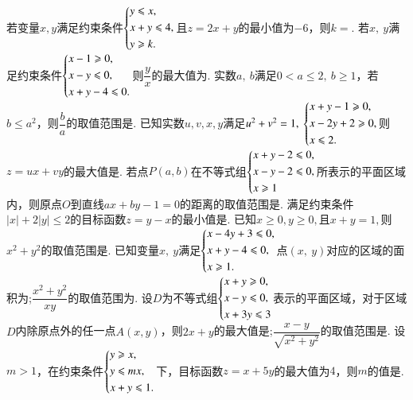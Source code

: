 \documentclass{BHCexam}
\begin{document}
\begin{questions}
\qs 若变量$x,y$满足约束条件$\begin{dcases}
y\le x,\\
x+y\le 4,\\
y\ge k.
\end{dcases}$且$z=2x+y$的最小值为$ -6 $，则$ k= $\tk.
\qs 若$  x,~y $满足约束条件$\begin{dcases}
x-1\ge 0,\\
x-y\le 0,\\
x+y-4\le 0.
\end{dcases}$则$ \dfrac{y}{x} $的最大值为\tk.
\qs 实数$ a,~b $满足$ 0<a\le 2,~b\ge 1 $，若$ b\le a^2 $，则$ \dfrac{b}{a} $的取值范围是\tk.
\qs 已知实数$ u,v,x,y $满足$ u^2+v^2=1,~\begin{dcases}
x+y-1\ge 0,\\
x-2y+2\ge 0,\\
x\le 2.
\end{dcases} $则$ z=ux+vy $的最大值是\tk.
\qs 若点$  P(a,b)  $在不等式组$\begin{dcases}
x+y-2\le 0,\\
x-y-2\le 0,\\
x\ge 1
\end{dcases}$所表示的平面区域内，则原点$ O $到直线$ ax+by-1=0 $的距离的取值范围是\tk.
\qs 满足约束条件$ \left|x\right|+2\left|y\right|\le 2 $的目标函数$ z=y-x $的最小值是\tk.
\qs 已知$ x\ge0,y\ge0 ,$且$ x+y=1 ,$则$ x^2+y^2 $的取值范围是\tk.
\qs 已知变量$ x,~y $满足$\begin{dcases}
x-4y+3\le 0,\\
x+y-4\le 0,\\
x\ge 1.
\end{dcases}$点$ (x,~y) $对应的区域的面积为\tk;$ \dfrac{x^2+y^2}{xy} $的取值范围为\tk.
\qs 设$ D $为不等式组$\begin{dcases}
x+y\ge0,\\
x-y\le0,\\
x+3y\le3 
\end{dcases}$表示的平面区域，对于区域$ D $内除原点外的任一点$ A(x,y) $，则$ 2x+y $的最大值是\tk;$ \dfrac{x-y}{\sqrt{x^2+y^2}} $的取值范围是\tk.
\qs 设$ m>1 $，在约束条件$\begin{dcases}
y\ge x,\\
y\le mx,\\
x+y\le1. 
\end{dcases}$下，目标函数$ z=x+5y $的最大值为$ 4 $，则$ m $的值是\tk.

\end{questions}
\end{document}
